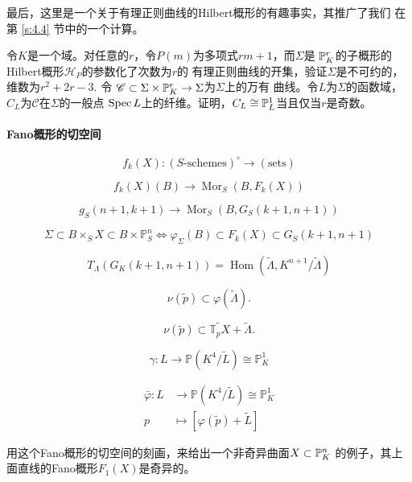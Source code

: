 最后，这里是一个关于有理正则曲线的Hilbert概形的有趣事实，其推广了我们
在第 \ref{s:4.4} 节中的一个计算。

\begin{exe}\label{exe:6.38}
令$K$是一个域。对任意的$r$，令$P(m)$为多项式$rm+1$，而$\Sigma$是
$\P_K^r$的子概形的Hilbert概形$\mathscr H_P$的参数化了次数为$r$的
有理正则曲线的开集\nottran ，验证$\Sigma$是不可约的，维数为$r^2+2r-3$. 令
$\mathscr C\subset \Sigma\times \P_K^r\to \Sigma$为$\Sigma$上的万有
曲线。令$L$为$\Sigma$的函数域，$C_L$为$\mathscr C$在$\Sigma$的一般点
$\spec L$上的纤维。证明，$C_L\cong \P_L^1$当且仅当$r$是奇数。
\end{exe}

\nottran

\paragraph*{Fano概形的切空间}

\[
    f_k(X):(\text{$S$-schemes})^\circ \to 
    (\text{sets})
\]

\[
    f_{k}(X)(B) \longrightarrow \operatorname{Mor}_{S}(B, F_{k}(X))
\]

\[
    g_{S}(n+1, k+1) \longrightarrow \operatorname{Mor}_{S}
    (B, G_{S}(k+1, n+1))
\]

\[
    \Sigma \subset B \times_{S} X \subset B \times \mathbb{P}_{S}^{n} \Longleftrightarrow 
    \varphi_{\Sigma}(B) \subset F_{k}(X) \subset G_{S}(k+1, n+1)
\]

\[
    T_{\Lambda}(G_{K}(k+1, n+1))=\operatorname{Hom}
    (\tilde{\Lambda}, K^{n+1} / \tilde{\Lambda})
\]


\[
    \nu(\tilde p)\subset \varphi(\tilde \Lambda).
\]

\[
    \nu(\tilde{p}) \subset \widetilde{\mathbb{T}_{p} X}+
    \tilde{\Lambda}.
\]

\[
    \gamma: L \longrightarrow \mathbb{P}(K^{4} / \tilde{L}) 
    \cong \mathbb{P}_{K}^{1}
\]

\[
    \begin{aligned}
        \bar{\varphi}: L &\longrightarrow \mathbb{P}(K^{4}/\tilde{L})
        \cong \mathbb{P}_{K}^{1} \\
        p &\longmapsto[\varphi(\tilde{p})+\tilde{L}]
    \end{aligned}
\]


\begin{exe}\label{exe:6.40}
    用这个Fano概形的切空间的刻画，来给出一个非奇异曲面$X\subset \P_K^n$
    的例子，其上面直线的Fano概形$F_1(X)$是奇异的。
\end{exe}

